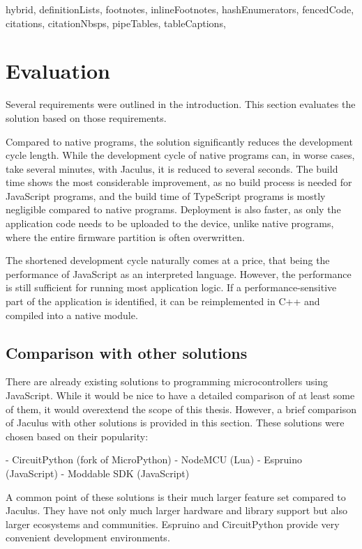 \begin{markdown*}{%
  hybrid,
  definitionLists,
  footnotes,
  inlineFootnotes,
  hashEnumerators,
  fencedCode,
  citations,
  citationNbsps,
  pipeTables,
  tableCaptions,
}


\chapter{Evaluation}

Several requirements were outlined in the introduction. This section evaluates the solution based on those requirements.

Compared to native programs, the solution significantly reduces the development cycle length. While the development cycle of native programs can, in worse cases, take several minutes, with Jaculus, it is reduced to several seconds. The build time shows the most considerable improvement, as no build process is needed for JavaScript programs, and the build time of TypeScript programs is mostly negligible compared to native programs. Deployment is also faster, as only the application code needs to be uploaded to the device, unlike native programs, where the entire firmware partition is often overwritten.

The shortened development cycle naturally comes at a price, that being the performance of JavaScript as an interpreted language. However, the performance is still sufficient for running most application logic. If a performance-sensitive part of the application is identified, it can be reimplemented in C++ and compiled into a native module.

\section{Comparison with other solutions}

There are already existing solutions to programming microcontrollers using JavaScript. While it would be nice to have a detailed comparison of at least some of them, it would overextend the scope of this thesis. However, a brief comparison of Jaculus with other solutions is provided in this section. These solutions were chosen based on their popularity:

- CircuitPython\cite{circuitpython} (fork of MicroPython\cite{micropython})
- NodeMCU\cite{nodemcu} (Lua)
- Espruino\cite{espruino} (JavaScript)
- Moddable SDK\cite{moddable} (JavaScript)

A common point of these solutions is their much larger feature set compared to Jaculus. They have not only much larger hardware and library support but also larger ecosystems and communities. Espruino and CircuitPython provide very convenient development environments.


\end{markdown*}

